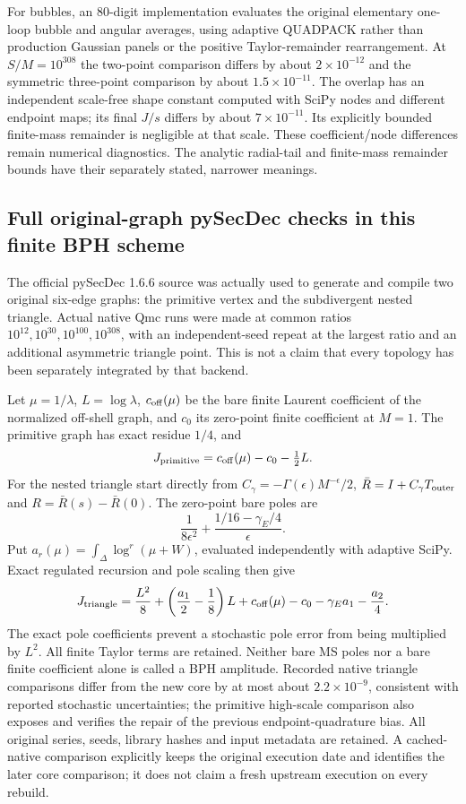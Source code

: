 For bubbles, an 80-digit implementation evaluates the original elementary
one-loop bubble and angular averages, using adaptive QUADPACK rather than
production Gaussian panels or the positive Taylor-remainder rearrangement.
At $S/M=10^{308}$ the two-point comparison differs by about
$2\times10^{-12}$ and the symmetric three-point comparison by about
$1.5\times10^{-11}$. The overlap has an independent scale-free shape
constant computed with SciPy nodes and different endpoint maps; its final
$J/s$ differs by about $7\times10^{-11}$. Its explicitly bounded finite-mass
remainder is negligible at that scale. These coefficient/node differences
remain numerical diagnostics. The analytic radial-tail and finite-mass
remainder bounds have their separately stated, narrower meanings.

\subsection{Full original-graph pySecDec checks in this finite BPH scheme}
The official pySecDec 1.6.6 source was actually used to generate and compile
two original six-edge graphs: the primitive vertex and the subdivergent
nested triangle. Actual native Qmc runs were made at common ratios
$10^{12},10^{30},10^{100},10^{308}$, with an independent-seed repeat at the
largest ratio and an additional asymmetric triangle point. This is not a
claim that every topology has been separately integrated by that backend.

Let $\mu=1/\lambda$, $L=\log\lambda$, $c_{\rm off}(\mu)$ be the bare finite
Laurent coefficient of the normalized off-shell graph, and $c_0$ its
zero-point finite coefficient at $M=1$. The primitive graph has exact
residue $1/4$, and
\[
 J_{\rm primitive}=c_{\rm off}(\mu)-c_0-\tfrac12 L.
\]
For the nested triangle start directly from
$C_\gamma=-\Gamma(\epsilon)M^{-\epsilon}/2$,
$\bar R=I+C_\gamma T_{\rm outer}$ and $R=\bar R(s)-\bar R(0)$.
The zero-point bare poles are
\[
 \frac1{8\epsilon^2}
 +\frac{1/16-\gamma_E/4}{\epsilon}.
\]
Put $a_r(\mu)=\int_\Delta\log^r(\mu+W)$, evaluated independently with
adaptive SciPy. Exact regulated recursion and pole scaling then give
\[
 J_{\rm triangle}=\frac{L^2}{8}
 +\left(\frac{a_1}2-\frac18\right)L
 +c_{\rm off}(\mu)-c_0-\gamma_Ea_1-\frac{a_2}4.
\]
The exact pole coefficients prevent a stochastic pole error from being
multiplied by $L^2$. All finite Taylor terms are retained. Neither bare MS
poles nor a bare finite coefficient alone is called a BPH amplitude.
Recorded native triangle comparisons differ from the new core by at most
about $2.2\times10^{-9}$, consistent with reported stochastic uncertainties;
the primitive high-scale comparison also exposes and verifies the repair of
the previous endpoint-quadrature bias. All original series, seeds, library
hashes and input metadata are retained. A cached-native comparison explicitly
keeps the original execution date and identifies the later core comparison;
it does not claim a fresh upstream execution on every rebuild.

